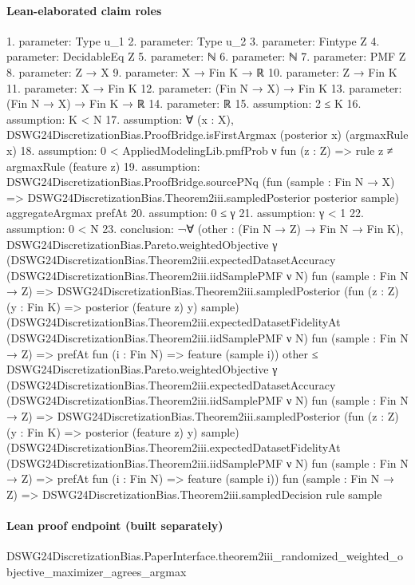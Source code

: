 \documentclass[10pt]{article}
\begin{document}
\paragraph{Lean-elaborated claim roles}\begin{ReviewVerbatim}
1. parameter: Type u_1
2. parameter: Type u_2
3. parameter: Fintype Z
4. parameter: DecidableEq Z
5. parameter: ℕ
6. parameter: ℕ
7. parameter: PMF Z
8. parameter: Z → X
9. parameter: X → Fin K → ℝ
10. parameter: Z → Fin K
11. parameter: X → Fin K
12. parameter: (Fin N → X) → Fin K
13. parameter: (Fin N → X) → Fin K → ℝ
14. parameter: ℝ
15. assumption: 2 ≤ K
16. assumption: K < N
17. assumption: ∀ (x : X), DSWG24DiscretizationBias.ProofBridge.isFirstArgmax (posterior x) (argmaxRule x)
18. assumption: 0 < AppliedModelingLib.pmfProb ν fun (z : Z) => rule z ≠ argmaxRule (feature z)
19. assumption: DSWG24DiscretizationBias.ProofBridge.sourcePNq
  (fun (sample : Fin N → X) => DSWG24DiscretizationBias.Theorem2iii.sampledPosterior posterior sample) aggregateArgmax
  prefAt
20. assumption: 0 ≤ γ
21. assumption: γ < 1
22. assumption: 0 < N
23. conclusion: ¬∀ (other : (Fin N → Z) → Fin N → Fin K),
    DSWG24DiscretizationBias.Pareto.weightedObjective γ
        (DSWG24DiscretizationBias.Theorem2iii.expectedDatasetAccuracy
          (DSWG24DiscretizationBias.Theorem2iii.iidSamplePMF ν N) fun (sample : Fin N → Z) =>
          DSWG24DiscretizationBias.Theorem2iii.sampledPosterior (fun (z : Z) (y : Fin K) => posterior (feature z) y)
            sample)
        (DSWG24DiscretizationBias.Theorem2iii.expectedDatasetFidelityAt
          (DSWG24DiscretizationBias.Theorem2iii.iidSamplePMF ν N) fun (sample : Fin N → Z) =>
          prefAt fun (i : Fin N) => feature (sample i))
        other ≤
      DSWG24DiscretizationBias.Pareto.weightedObjective γ
        (DSWG24DiscretizationBias.Theorem2iii.expectedDatasetAccuracy
          (DSWG24DiscretizationBias.Theorem2iii.iidSamplePMF ν N) fun (sample : Fin N → Z) =>
          DSWG24DiscretizationBias.Theorem2iii.sampledPosterior (fun (z : Z) (y : Fin K) => posterior (feature z) y)
            sample)
        (DSWG24DiscretizationBias.Theorem2iii.expectedDatasetFidelityAt
          (DSWG24DiscretizationBias.Theorem2iii.iidSamplePMF ν N) fun (sample : Fin N → Z) =>
          prefAt fun (i : Fin N) => feature (sample i))
        fun (sample : Fin N → Z) => DSWG24DiscretizationBias.Theorem2iii.sampledDecision rule sample
\end{ReviewVerbatim}

\paragraph{Lean proof endpoint (built separately)}\begin{ReviewVerbatim}
DSWG24DiscretizationBias.PaperInterface.theorem2iii_randomized_weighted_objective_maximizer_agrees_argmax
\end{ReviewVerbatim}
\end{document}
